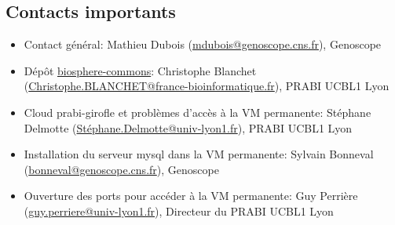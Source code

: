 \subsection{Contacts importants}

\begin{itemize}
	\item Contact général: Mathieu Dubois (\href{mailto:mdubois@genoscope.cns.fr}{mdubois@genoscope.cns.fr}), Genoscope
	\item Dépôt \href{https://github.com/IFB-ElixirFr/biosphere-commons}{biosphere-commons}: Christophe Blanchet (\href{mailto:Christophe.BLANCHET@france-bioinformatique.fr}{Christophe.BLANCHET@france-bioinformatique.fr}), PRABI UCBL1 Lyon
	\item Cloud prabi-girofle et problèmes d'accès à la VM permanente: Stéphane Delmotte (\href{mailto:Stéphane.Delmotte@univ-lyon1.fr}{Stéphane.Delmotte@univ-lyon1.fr}), PRABI UCBL1 Lyon
	\item Installation du serveur mysql dans la VM permanente: Sylvain Bonneval (\href{mailto:bonneval@genoscope.cns.fr}{bonneval@genoscope.cns.fr}), Genoscope
	\item Ouverture des ports pour accéder à la VM permanente: Guy Perrière (\href{mailto:guy.perriere@univ-lyon1.fr}{guy.perriere@univ-lyon1.fr}), Directeur du PRABI UCBL1 Lyon
\end{itemize}
